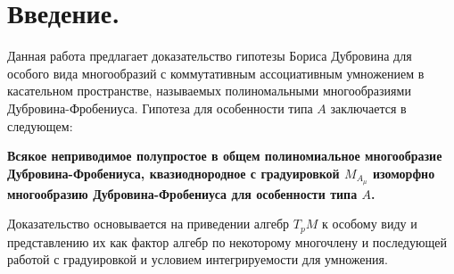 \section{Введение.}
Данная работа предлагает доказательство гипотезы Бориса Дубровина для особого вида многообразий с коммутативным ассоциативным умножением в касательном пространстве, называемых полиномальными многообразиями Дубровина-Фробениуса. Гипотеза для особенности типа \(A\) заключается в следующем: 
\begin{center}
	\textbf{
		Всякое неприводимое полупростое в общем полиномиальное многообразие Дубровина-Фробениуса, квазиоднородное с градуировкой \(M_{A_\mu}\) изоморфно многообразию Дубровина-Фробениуса для особенности типа \(A\).
	}
\end{center}
Доказательство основывается на приведении алгебр \(T_pM\) к особому виду и представлению их как фактор алгебр по некоторому многочлену и последующей работой с градуировкой и условием интегрируемости для умножения.